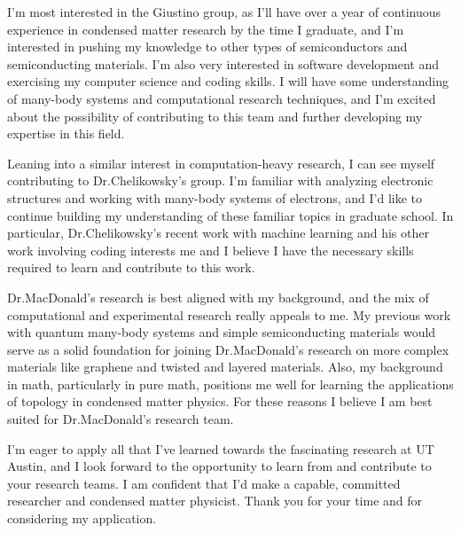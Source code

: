 \documentclass[11pt]{article}
\newcommand{\schoolabbr}{UT Austin}
\begin{document}
I'm most interested in the Giustino group, as I'll have over a year of continuous experience in condensed matter research by the time I graduate, and I'm interested in pushing my knowledge to other types of semiconductors and semiconducting materials. I'm also very interested in software development and exercising my computer science and coding skills. I will have some understanding of many-body systems and computational research techniques, and I'm excited about the possibility of contributing to this team and further developing my expertise in this field.

Leaning into a similar interest in computation-heavy research, I can see myself contributing to Dr.\@ Chelikowsky's group. I'm familiar with analyzing electronic structures and working with many-body systems of electrons, and I'd like to continue building my understanding of these familiar topics in graduate school. In particular, Dr.\@ Chelikowsky's recent work with machine learning and his other work involving coding interests me and I believe I have the necessary skills required to learn and contribute to this work.

Dr.\@ MacDonald's research is best aligned with my background, and the mix of computational and experimental research really appeals to me. My previous work with quantum many-body systems and simple semiconducting materials would serve as a solid foundation for joining Dr.\@ MacDonald's research on more complex materials like graphene and twisted and layered materials. Also, my background in math, particularly in pure math, positions me well for learning the applications of topology in condensed matter physics. For these reasons I believe I am best suited for Dr.\@ MacDonald's research team.

I'm eager to apply all that I've learned towards the fascinating research at \schoolabbr{}, and I look forward to the opportunity to learn from and contribute to your research teams. I am confident that I'd make a capable, committed researcher and condensed matter physicist. Thank you for your time and for considering my application.
\end{document}

